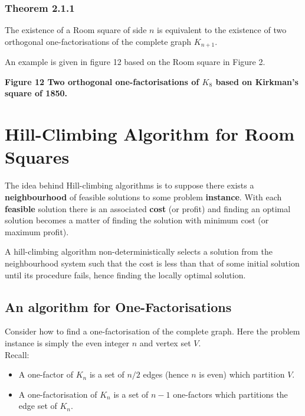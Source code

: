 \documentclass[
  12pt,
  a4paper]{book}
\begin{document}
\hypertarget{theorem-2.1.1}{%
\subsubsection{Theorem 2.1.1}\label{theorem-2.1.1}}

The existence of a Room square of side \(n\) is equivalent to the
existence of two orthogonal one-factorisations of the complete graph
\(K_{n+1}\).

An example is given in figure 12 based on the Room square in Figure 2.

\textbf{Figure 12 Two orthogonal one-factorisations of \(K_8\) based on
Kirkman's square of 1850.}

\hypertarget{hill-climbing-algorithm-for-room-squares}{%
\section{Hill-Climbing Algorithm for Room
Squares}\label{hill-climbing-algorithm-for-room-squares}}

The idea behind Hill-climbing algorithms is to suppose there exists a
\textbf{neighbourhood} of feasible solutions to some problem
\textbf{instance}. With each \textbf{feasible} solution there is an
associated \textbf{cost} (or profit) and finding an optimal solution
becomes a matter of finding the solution with minimum cost (or maximum
profit).

A hill-climbing algorithm non-deterministically selects a solution from
the neighbourhood system such that the cost is less than that of some
initial solution until its procedure fails, hence finding the locally
optimal solution.

\hypertarget{an-algorithm-for-one-factorisations}{%
\subsection{An algorithm for
One-Factorisations}\label{an-algorithm-for-one-factorisations}}

Consider how to find a one-factorisation of the complete graph. Here the
problem instance is simply the even integer \(n\) and vertex set
\(V\).\\
Recall:

\begin{itemize}
\item
  A one-factor of \(K_n\) is a set of \(n/2\) edges (hence \(n\) is
  even) which partition \(V\).
\item
  A one-factorisation of \(K_n\) is a set of \(n-1\) one-factors which
  partitions the edge set of \(K_n\).
\end{itemize}
\end{document}
